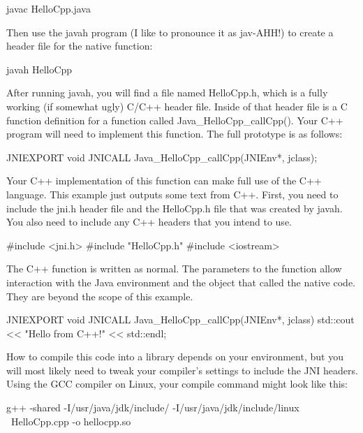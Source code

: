 \begin{shell}
javac HelloCpp.java
\end{shell}

Then use the javah program (I like to pronounce it as jav-AHH!) to create a header file for the native function:

\begin{shell}
javah HelloCpp
\end{shell}

After running javah, you will find a file named HelloCpp.h, which is a fully working (if somewhat ugly) C/C++ header file. Inside of that header file is a C function definition for a function called Java\_HelloCpp\_callCpp(). Your C++ program will need to implement this function. The full prototype is as follows:

\begin{cpp}
JNIEXPORT void JNICALL Java_HelloCpp_callCpp(JNIEnv*, jclass);
\end{cpp}

Your C++ implementation of this function can make full use of the C++ language. This example just outputs some text from C++. First, you need to include the jni.h header file and the HelloCpp.h file that was created by javah. You also need to include any C++ headers that you intend to use.

\begin{cpp}
#include <jni.h>
#include "HelloCpp.h"
#include <iostream>
\end{cpp}

The C++ function is written as normal. The parameters to the function allow interaction with the Java environment and the object that called the native code. They are beyond the scope of this example.

\begin{cpp}
JNIEXPORT void JNICALL Java_HelloCpp_callCpp(JNIEnv*, jclass)
{
    std::cout << "Hello from C++!" << std::endl;
}
\end{cpp}

How to compile this code into a library depends on your environment, but you will most likely need to tweak your compiler’s settings to include the JNI headers. Using the GCC compiler on Linux, your compile command might look like this:

\begin{shell}
g++ -shared -I/usr/java/jdk/include/ -I/usr/java/jdk/include/linux \
HelloCpp.cpp -o hellocpp.so
\end{shell}

